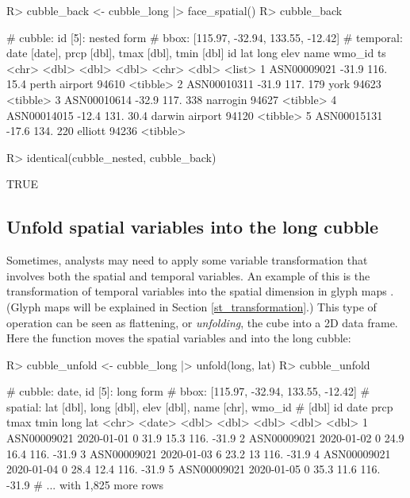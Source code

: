 \documentclass[
]{jss}
\begin{document}
\begin{CodeChunk}
\begin{CodeInput}
R> cubble_back <- cubble_long |> face_spatial()
R> cubble_back
\end{CodeInput}
\begin{CodeOutput}
# cubble:   id [5]: nested form
# bbox:     [115.97, -32.94, 133.55, -12.42]
# temporal: date [date], prcp [dbl], tmax [dbl], tmin [dbl]
  id            lat  long  elev name           wmo_id ts      
  <chr>       <dbl> <dbl> <dbl> <chr>           <dbl> <list>  
1 ASN00009021 -31.9  116.  15.4 perth airport   94610 <tibble>
2 ASN00010311 -31.9  117. 179   york            94623 <tibble>
3 ASN00010614 -32.9  117. 338   narrogin        94627 <tibble>
4 ASN00014015 -12.4  131.  30.4 darwin airport  94120 <tibble>
5 ASN00015131 -17.6  134. 220   elliott         94236 <tibble>
\end{CodeOutput}
\begin{CodeInput}
R> identical(cubble_nested, cubble_back)
\end{CodeInput}
\begin{CodeOutput}
[1] TRUE
\end{CodeOutput}
\end{CodeChunk}

\hypertarget{unfold}{%
\subsection{Unfold spatial variables into the long cubble}\label{unfold}}

Sometimes, analysts may need to apply some variable transformation that involves both the spatial and temporal variables. An example of this is the transformation of temporal variables into the spatial dimension in glyph maps \citep{Wickham2012-yr}. (Glyph maps will be explained in Section \ref{st_transformation}.) This type of operation can be seen as flattening, or \emph{unfolding}, the cube into a 2D data frame. Here the function  moves the spatial variables  and  into the long cubble:

\begin{CodeChunk}
\begin{CodeInput}
R> cubble_unfold <- cubble_long |> unfold(long, lat)
R> cubble_unfold
\end{CodeInput}
\begin{CodeOutput}
# cubble:  date, id [5]: long form
# bbox:    [115.97, -32.94, 133.55, -12.42]
# spatial: lat [dbl], long [dbl], elev [dbl], name [chr], wmo_id
#   [dbl]
  id          date        prcp  tmax  tmin  long   lat
  <chr>       <date>     <dbl> <dbl> <dbl> <dbl> <dbl>
1 ASN00009021 2020-01-01     0  31.9  15.3  116. -31.9
2 ASN00009021 2020-01-02     0  24.9  16.4  116. -31.9
3 ASN00009021 2020-01-03     6  23.2  13    116. -31.9
4 ASN00009021 2020-01-04     0  28.4  12.4  116. -31.9
5 ASN00009021 2020-01-05     0  35.3  11.6  116. -31.9
# ... with 1,825 more rows
\end{CodeOutput}
\end{CodeChunk}
\end{document}
